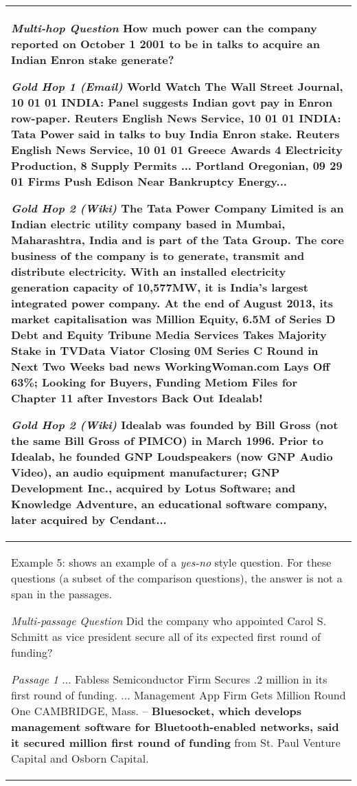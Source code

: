 \documentclass{article}
\newcommand{\blue}[1]{{\color{blue}#1}}
\begin{document}
\begin{table*}[t]
\begin{tabular}{p{15cm}}
\textit{Multi-hop Question} How much power can the company reported on October 1 2001 to be in talks to acquire an Indian Enron stake generate?\newline

\textit{Gold Hop 1 (Email)} World Watch The Wall Street Journal, 10 01 01 INDIA: Panel suggests Indian govt pay in Enron row-paper. Reuters English News Service, 10 01 01 INDIA: \textbf{Tata Power said in talks to buy India Enron stake}. Reuters English News Service, 10 01 01 Greece Awards 4 Electricity Production, 8 Supply Permits ... Portland Oregonian, 09 29 01 Firms Push Edison Near Bankruptcy Energy...\newline

\textit{Gold Hop 2 (Wiki)} The Tata Power Company Limited is an Indian electric utility company based in Mumbai, Maharashtra, India and is part of the Tata Group. The core business of the company is to generate, transmit and distribute electricity. With an installed \textbf{electricity generation capacity of 10,577MW}, it is India's largest integrated power company. At the end of August 2013, its market capitalisation was \48 Million Equity, \66.5M of Series D Debt and Equity Tribune Media Services Takes Majority Stake in TVData Viator Closing \10M Series C Round in Next Two Weeks bad news WorkingWoman.com Lays Off 63\%; Looking for Buyers, Funding \textbf{Metiom Files for Chapter 11 after Investors Back Out Idealab!}\newline

\textit{Gold Hop 2 (Wiki)} \textbf{Idealab was founded by Bill Gross (not the same Bill Gross of PIMCO) in March 1996.} Prior to Idealab, he founded GNP Loudspeakers (now GNP Audio Video), an audio equipment manufacturer; GNP Development Inc., acquired by Lotus Software; and Knowledge Adventure, an educational software company, later acquired by Cendant... \\
\midrule
\blue{Example 5: shows an example of a \textit{yes-no} style question. For these questions (a subset of the comparison questions), the answer is not a span in the passages.}\newline

\textit{Multi-passage Question} Did the company who appointed Carol S. Schmitt as vice president secure all of its expected first round of funding?\newline

\textit{Passage 1} ... Fabless Semiconductor Firm Secures \8.2 million in its first round of funding. ...  Management App Firm Gets \8 Million Round One CAMBRIDGE, Mass. -- \textbf{Bluesocket, which develops management software for Bluetooth-enabled networks, said it secured \8 million first round of funding} from St. Paul Venture Capital and Osborn Capital.\newline


\end{tabular}
\end{table*}
\end{document}
